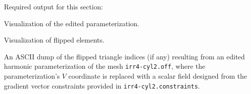\documentclass[11pt]{amsart}
\newcommand{\itemz}[1]{{\begin{itemize}{#1}\end{itemize}}}
\begin{document}
Required output for this section:
\itemz{
\item{Visualization of the edited parameterization.}
\item{Visualization of flipped elements.}
\item{An ASCII dump of the flipped triangle indices (if any) resulting from an
    edited harmonic parameterization of the mesh \texttt{irr4-cyl2.off}, where
    the parameterization's $V$ coordinate is replaced with a scalar field
    designed from the gradient vector constraints provided in
    \texttt{irr4-cyl2.constraints}.}
}
\end{document}
